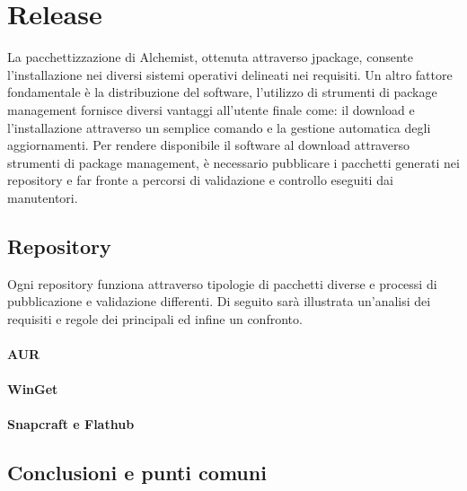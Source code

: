 \section{Release}

La pacchettizzazione di Alchemist, ottenuta attraverso jpackage, consente l'installazione nei diversi sistemi operativi delineati nei requisiti. Un altro fattore fondamentale è la distribuzione del software, l'utilizzo di strumenti di package management fornisce diversi vantaggi all'utente finale come: il download e l'installazione attraverso un semplice comando e la gestione automatica degli aggiornamenti. Per rendere disponibile il software al download attraverso strumenti di package management, è necessario pubblicare i pacchetti generati nei repository e far fronte a percorsi di validazione e controllo eseguiti dai manutentori.

\subsection{Repository}

Ogni repository funziona attraverso tipologie di pacchetti diverse e processi di pubblicazione e validazione differenti. Di seguito sarà illustrata un'analisi dei requisiti e regole dei principali ed infine un confronto.

\paragraph{AUR}

\paragraph{WinGet}

\paragraph{Snapcraft e Flathub}

\subsection{Conclusioni e punti comuni}

